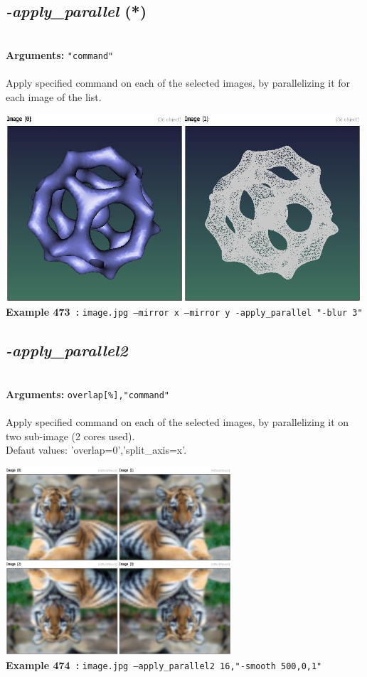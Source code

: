 \documentclass[a4paper,11pt,twoside]{book}
\begin{document}
\subsection{\emph{-apply\_parallel} (*)}\vspace*{-0.5em}
~\\\textbf{Arguments: } 
{\small \texttt{"command"}}\\~\\
Apply specified command on each of the selected images, by parallelizing it for each image of the list.
\begin{center}\includegraphics[keepaspectratio=true,height=7cm,width=\textwidth]{img/gmic_def473.jpg}\\
{\footnotesize \textbf{Example 473~:} \texttt{image.jpg --mirror x --mirror y -apply\_parallel "-blur 3"}}
\end{center}

\subsection{\emph{-apply\_parallel2} }\vspace*{-0.5em}
~\\\textbf{Arguments: } 
{\small \texttt{overlap[\%],"command"}}\\~\\
Apply specified command on each of the selected images, by parallelizing it on two sub-image (2 cores used).
~\\Defaut values: 'overlap=0','split\_axis=x'.
\begin{center}\includegraphics[keepaspectratio=true,height=7cm,width=\textwidth]{img/gmic_def474.jpg}\\
{\footnotesize \textbf{Example 474~:} \texttt{image.jpg --apply\_parallel2 16,"-smooth 500,0,1"}}
\end{center}
\end{document}
